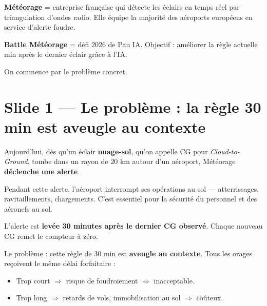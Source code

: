 \documentclass[11pt,a4paper]{article}
\begin{document}
\begin{compr}
\textbf{Météorage} = entreprise française qui détecte les éclairs en temps réel par
triangulation d'ondes radio. Elle équipe la majorité des aéroports européens en service
d'alerte foudre.

\textbf{Battle Météorage} = défi 2026 de Pau IA. Objectif : améliorer la règle actuelle
 min après le dernier éclair \fg{} grâce à l'IA.
\end{compr}

\begin{transit}
\og On commence par le problème concret. \fg{}
\end{transit}

\section{Slide 1 — Le problème : la règle 30 min est aveugle au contexte}

\begin{dire}
\og Aujourd'hui, dès qu'un éclair \textbf{nuage-sol}, qu'on appelle CG pour
\emph{Cloud-to-Ground}, tombe dans un rayon de 20 km autour d'un aéroport, Météorage
\textbf{déclenche une alerte}.

Pendant cette alerte, l'aéroport interrompt ses opérations au sol — atterrissages,
ravitaillements, chargements. C'est essentiel pour la sécurité du personnel et des aéronefs
au sol.

L'alerte est \textbf{levée 30 minutes après le dernier CG observé}. Chaque nouveau CG
remet le compteur à zéro.

Le problème : cette règle de 30 min est \textbf{aveugle au contexte}. Tous les orages
reçoivent le même délai forfaitaire :
\begin{itemize}
    \item Trop court $\Rightarrow$ risque de foudroiement $\Rightarrow$ inacceptable.
    \item Trop long $\Rightarrow$ retards de vols, immobilisation au sol $\Rightarrow$ coûteux.
\end{itemize}
\fg{}
\end{dire}
\end{document}
